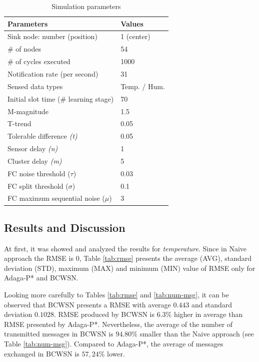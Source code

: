\documentclass{acm_proc_article-sp}
\begin{document}
\begin{table}[h!]
\tiny 
\caption{Simulation parameters}
\label{tab:parameters}
\begin{center}
\begin{tabular}{|l||l|}
\hline
Parameters &Values\\
\hline\hline
Sink node: number (position) &1 (center) \\
\hline
\# of nodes &54 \\
\hline
\# of cycles executed &1000 \\
\hline
Notification rate (per second) &31 \\
\hline
Sensed data types &Temp. / Hum. \\
\hline
Initial slot time (\# learning stage) &70 \\
\hline
M-magnitude &1.5 \\
\hline
T-trend &0.05 \\
\hline
Tolerable difference {\it(t)} &0.05 \\
\hline
Sensor delay {\it(n)} &1 \\
\hline
Cluster delay {\it(m)} &5 \\
\hline
FC noise threshold ($\tau$) &0.03 \\
\hline
FC split threshold ($\sigma$) &0.1 \\
\hline
FC maximum sequential noise ($\mu$) &3 \\
\hline
\end{tabular}
\end{center}
\end{table}
\vspace*{-.3cm}


\subsection{Results and Discussion}
\label{results-and-discussion}

At first, it was showed and analyzed the results for {\it temperature}. Since in
Naive approach the RMSE is $0$, Table \ref{tab:rmse} presents the average (AVG),
standard deviation (STD), maximum (MAX) and minimum (MIN) value of RMSE only for
Adaga-P* and BCWSN.
\vspace*{-.3cm}

Looking more carefully to Tables \ref{tab:rmse} and \ref{tab:num-msg}, it can be
observed that BCWSN presents a RMSE with average $0.443$ and standard deviation
$0.1028$. RMSE produced by BCWSN is $6.3\%$ higher in average than RMSE
presented by Adaga-P*. Nevertheless, the average of the number of transmitted
messages in BCWSN is $94.80\%$ smaller than the Naive approach (see Table
\ref{tab:num-msg}). Compared to Adaga-P*, the average of messages exchanged in
BCWSN is $57,24\%$ lower.
\end{document}
